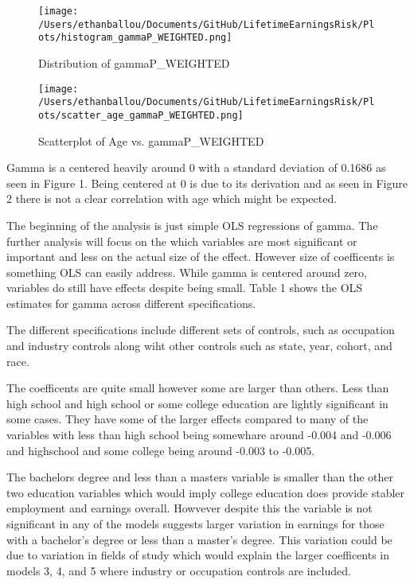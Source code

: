 \documentclass[12pt]{article}
\begin{document}






\begin{figure}[H]
    \centering
    \texttt{[image: /Users/ethanballou/Documents/GitHub/LifetimeEarningsRisk/Plots/histogram\_gammaP\_WEIGHTED.png]}
    \caption{Distribution of gammaP\_WEIGHTED}
\end{figure}



\begin{figure}[H]
    \centering
    \texttt{[image: /Users/ethanballou/Documents/GitHub/LifetimeEarningsRisk/Plots/scatter\_age\_gammaP\_WEIGHTED.png]}
    \caption{Scatterplot of Age vs. gammaP\_WEIGHTED}
\end{figure}







Gamma is a centered heavily around 0 with a standard deviation of 0.1686 as seen in Figure 1. Being centered at 0 is due to its derivation and as seen in Figure 2 there is not a clear correlation with age which might be expected.


The beginning of the analysis is just simple OLS regressions of gamma. The further analysis will focus on the which variables are most significant or important and less on the actual size of the effect. However size of coefficents is something OLS can easily address. While gamma is centered around zero, variables do still have effects despite being small. Table 1 shows the OLS estimates for gamma across different specifications. 

The different specifications include different sets of controls, such as occupation and industry controls along wiht other controls such as state, year, cohort, and race.

The coefficents are quite small however some are larger than others. Less than high school and high school or some college education are lightly significant in some cases. They have some of the larger effects compared to many of the variables with less than high school being somewhare around -0.004 and -0.006 and highschool and some college being around -0.003 to -0.005. 

The bachelors degree and less than a masters variable is smaller than the other two education variables which would imply college education does provide stabler employment and earnings overall. Howvever despite this the variable is not significant in any of the models suggests larger variation in earnings for those with a bachelor's degree or less than a master's degree. This variation could be due to variation in fields of study which would explain the larger coefficents in models 3, 4, and 5 where industry or occupation controls are included.
\end{document}

